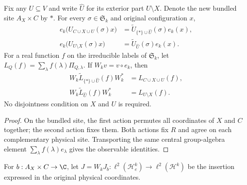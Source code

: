 \begin{theorem}
    \label{thm:bell_insertion_subsystem_coordinates}
    \leanok
    Fix any $U\subseteq V$ and write $\widehat U$ for its exterior part
    $U\setminus X$. Denote the new bundled site $A_X\times C$ by $*$.
    For every $\sigma\in\mathfrak S_k$ and original configuration $x$,
    \begin{align*}
        e_k\bigl(U_{C\cup X\cup U}(\sigma)x\bigr)
            &=\widetilde U_{\{*\}\cup\widehat U}(\sigma)e_k(x),\\
        e_k\bigl(U_{U\setminus X}(\sigma)x\bigr)
            &=\widetilde U_{\widehat U}(\sigma)e_k(x).
    \end{align*}
    For a real function $f$ on the irreducible labels of $\mathfrak S_k$,
    let $L_Q(f)=\sum_\lambda f(\lambda)\Pi_{Q,\lambda}$.
    If $W_kv=v\circ e_k$, then
    \begin{align*}
        W_k\widetilde L_{\{*\}\cup\widehat U}(f)W_k^*
            &=L_{C\cup X\cup U}(f),\\
        W_k\widetilde L_{\widehat U}(f)W_k^*
            &=L_{U\setminus X}(f).
    \end{align*}
    No disjointness condition on $X$ and $U$ is required.
\end{theorem}
\begin{proof}\leanok
    On the bundled site, the first action permutes all coordinates of
    $X$ and $C$ together; the second action fixes them. Both actions fix
    $R$ and agree on each complementary physical site.
    Transporting the same central group-algebra element
    $\sum_\lambda f(\lambda)e_\lambda$ gives the observable identities.
\end{proof}

For $b:A_X\times C\to\C$, let
$J=W_kJ_b:\ell^2(\mathcal H_e^k)\to\ell^2(\mathcal H^k)$
be the insertion expressed in the original physical coordinates.

